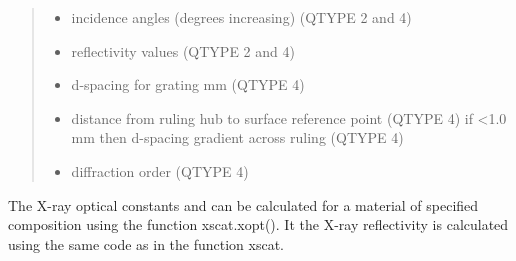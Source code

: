 \documentclass[letterpaper,10pt,english]{sphinxmanual}
\begin{document}
\begin{fulllineitems}
\begin{quote}
\begin{description}
\begin{itemize}
\item {} 
 \textendash{} incidence angles (degrees increasing) (QTYPE 2 and 4)

\item {} 
 \textendash{} reflectivity values (QTYPE 2 and 4)

\item {} 
 \textendash{} d-spacing for grating mm (QTYPE 4)

\item {} 
 \textendash{} distance from ruling hub to surface reference point (QTYPE 4)
if \textless{}1.0 mm then d-spacing gradient across ruling (QTYPE 4)

\item {} 
 \textendash{} diffraction order (QTYPE 4)

\end{itemize}

\end{description}\end{quote}

The X-ray optical constants  and  can be calculated for
a material of specified composition using the function xscat.xopt().
It  the X-ray reflectivity is calculated using the same
code as in the function xscat.

\end{fulllineitems}

\end{document}
